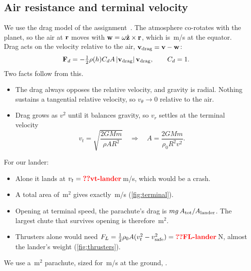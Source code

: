 \documentclass[aps,prd,twocolumn,nofootinbib,floatfix,superscriptaddress]{revtex4-2}
\begin{document}
\subsection{Air resistance and terminal velocity}
We use the drag model of the assignment~\cite{ast2000project}.
The atmosphere co-rotates with the planet, so the air at $\mathbf{r}$ moves with $\mathbf{w}=\omega\hat{\mathbf{z}}\times\mathbf{r}$, which is \,m/s at the equator.
Drag acts on the velocity relative to the air, $\mathbf{v}_{\rm drag}=\mathbf{v}-\mathbf{w}$:
\begin{equation}
  \mathbf{F}_d=-\tfrac12\rho(h)C_dA\,|\mathbf{v}_{\rm drag}|\,\mathbf{v}_{\rm drag},\qquad C_d=1 .
\end{equation}
Two facts follow from this.
\begin{itemize}
\item The drag always opposes the relative velocity, and gravity is radial. Nothing sustains a tangential relative velocity, so $v_\theta\to0$ relative to the air.
\item Drag grows as $v^2$ until it balances gravity, so $v_r$ settles at the terminal velocity
\begin{equation}
  v_t=\sqrt{\frac{2GMm}{\rho AR^2}}\quad\Longrightarrow\quad A=\frac{2GMm}{\rho_0R^2v^2}.
\end{equation}
\end{itemize}
For our lander:
\begin{itemize}
\item Alone it lands at $v_t=\val{vt-lander}$\,m/s, which would be a crash.
\item A total area of \,m$^2$ gives exactly \,m/s (\cref{fig:terminal}).
\item Opening at terminal speed, the parachute's drag is $mg\,A_{\rm tot}/A_{\rm lander}$. The largest chute that survives opening is therefore \,m$^2$.
\item Thrusters alone would need $F_L=\tfrac12\rho_0A(v_t^2-v_{\rm safe}^2)=\val{FL-lander}$\,N, almost the lander's weight (\cref{fig:thrusters}).
\end{itemize}
We use a \,m$^2$ parachute, sized for \,m/s at the ground, .

\end{document}
